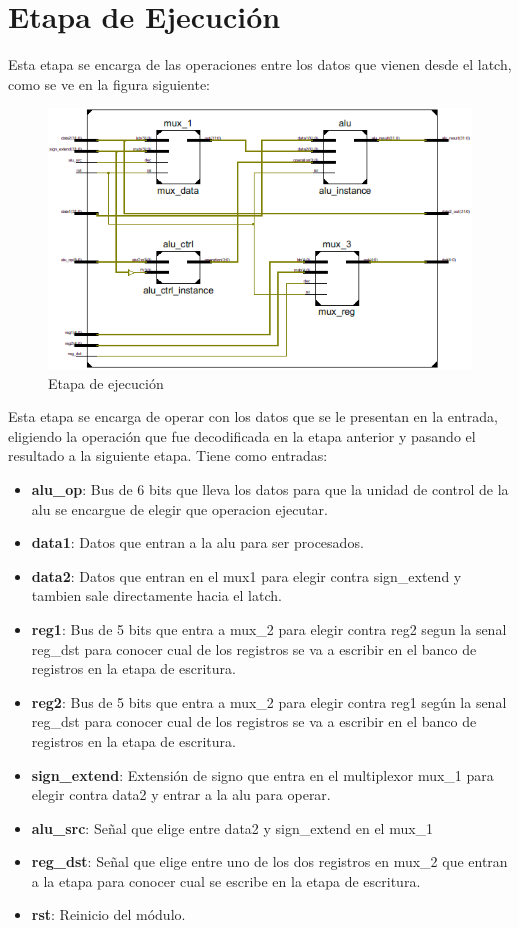 \section{Etapa de Ejecuci\'on}
Esta etapa se encarga de las operaciones entre los datos que vienen desde el latch, como se ve en la figura siguiente:

\begin{figure}[H]
\centering
\includegraphics[scale=0.5]{img/execute_stage_inside}
\caption{Etapa de ejecuci\'on}
\label{fig:fetch}
\end{figure}

Esta etapa se encarga de operar con los datos que se le presentan en la entrada, eligiendo la operaci\'on que fue decodificada en la etapa anterior y pasando el resultado a la siguiente etapa.
Tiene como entradas:

\begin{itemize}
  \item \textbf{alu\_op}: Bus de 6 bits que lleva los datos para que la unidad de control de la alu se encargue de elegir que operacion ejecutar.	
  \item \textbf{data1}: Datos que entran a la alu para ser procesados.
  \item \textbf{data2}: Datos que entran en el mux1 para elegir contra sign\_extend y tambien sale directamente hacia el latch.
  \item \textbf{reg1}: Bus de 5 bits que entra a mux\_2 para elegir contra reg2 segun la senal reg\_dst para conocer cual de los registros se va a escribir en el banco de registros en la etapa de escritura.
  \item \textbf{reg2}: Bus de 5 bits que entra a mux\_2 para elegir contra reg1 seg\'un la senal reg\_dst para conocer cual de los registros se va a escribir en el banco de registros en la etapa de escritura. 	
  \item \textbf{sign\_extend}: Extensi\'on de signo que entra en el multiplexor mux\_1 para elegir contra data2 y entrar a la alu para operar.
  \item \textbf{alu\_src}: Señal que elige entre data2 y sign\_extend en el mux\_1
  \item \textbf{reg\_dst}: Señal que elige entre uno de los dos registros en mux\_2 que entran a la etapa para conocer cual se escribe en la etapa de escritura.
  \item \textbf{rst}: Reinicio del m\'odulo. 
\end{itemize}

